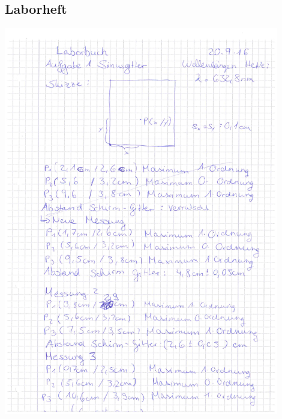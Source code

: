 \documentclass[12pt]{article}
\begin{document}
\subsection{Laborheft\label{Laborheft}} 
\begin{minipage}{\textwidth}
\centering
\includegraphics[width=0.9\textwidth]{figures/Laborbuch2.pdf}
\end{minipage}
\end{document}
